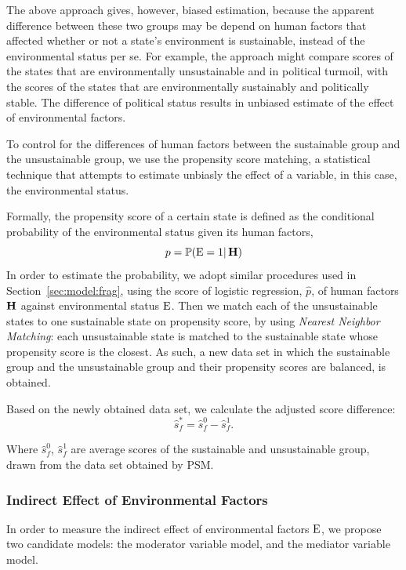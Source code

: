 The above approach gives, however, biased estimation, because the apparent difference between these two groups may be depend on human factors that affected whether or not a state's environment is sustainable, instead of the environmental status per se. For example, the approach might compare scores of the states that are environmentally unsustainable and in political turmoil, with the scores of the states that are environmentally sustainably and politically stable. The difference of political status results in unbiased estimate of the effect of environmental factors.

To control for the differences of human factors between the sustainable group and the unsustainable group, we use the propensity score matching, a statistical technique that attempts to estimate unbiasly the effect of a variable, in this case, the environmental status.

Formally, the propensity score of a certain state is defined as the conditional probability of the environmental status given its human factors,
\begin{equation}
   p=\mathbb P(\operatorname*{E}=1|\operatorname*{\mathbf{H}})
   \label{eqn:model:propensity}
\end{equation}
In order to estimate the probability, we adopt similar procedures used in Section~\ref{sec:model:frag}, using the score of logistic regression, $\hat{p}$, of human factors $\operatorname*{\mathbf{H}}$ against environmental status $\operatorname*{E}$. Then we match each of the unsustainable states to one sustainable state on propensity score, by using \emph{Nearest Neighbor Matching}: each unsustainable state is matched to the sustainable state whose propensity score is the closest. As such, a new data set in which the sustainable group and the unsustainable group and their propensity scores are balanced, is obtained. 

Based on the newly obtained data set, we calculate the adjusted score difference:
\begin{equation}
   \hat{s}^*_f=\hat{s}^0_f - \hat{s}^1_f.
   \label{eqn:model:score_diff_adj}
\end{equation}

Where $\hat{s}^0_f$, $\hat{s}^1_f$ are average scores of the sustainable and unsustainable group, drawn from the data set obtained by PSM.

\subsubsection{Indirect Effect of Environmental Factors}
In order to measure the indirect effect of environmental factors $\operatorname*{E}$, we propose two candidate models: the moderator variable model, and the mediator variable model.

